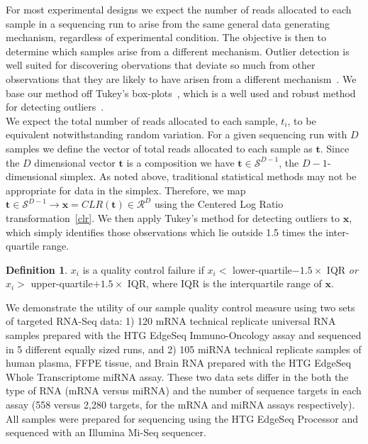 \documentclass{article}\usepackage[]{graphicx}\usepackage[]{color}
\theoremstyle{definition}
\newtheorem{definition}{Definition}
\begin{document}
For most experimental designs we expect the number of reads allocated to each sample in a sequencing run to arise from the same general data generating mechanism, regardless of experimental condition.  The objective is then to determine which samples arise from a different mechanism.  Outlier detection is well suited for discovering obervations that deviate so much from other observations that they are likely to have arisen from a different mechanism~\cite{Hawkins1980}.  We base our method off Tukey's box-plots~\cite{Tukey1977}, which is a well used and robust method for detecting outliers~\cite{Ben-Gal2009}.\\

We expect the total number of reads allocated to each sample, $t_i$, to be equivalent notwithstanding random variation. For a given sequencing run with $D$ samples we define the vector of total reads allocated to each sample as $\mathbf{t}$.  Since the $D$ dimensional vector $\mathbf{t}$ is a composition we have $\mathbf{t} \in \mathcal{S}^{D-1}$, the $D-1$-dimensional simplex. As noted above, traditional statistical methods may not be appropriate for data in the simplex.  Therefore, we map $\mathbf{t} \in \mathcal{S}^{D-1} \rightarrow \mathbf{x} = CLR(\mathbf{t}) \in \mathcal{R}^D$ using the Centered Log Ratio transformation~\ref{clr}.  We then apply Tukey's method for detecting outliers to $\mathbf{x}$, which simply identifies those observations which lie outside 1.5 times the inter-quartile range.

\theoremstyle{definition}
\begin{definition}
$x_i$ is a quality control failure if $x_i <$ lower-quartile$- 1.5 \times$ IQR \emph{or}  $x_i >$ upper-quartile$+ 1.5 \times$ IQR, where IQR is the interquartile range of $\mathbf{x}$.
\end{definition}

We demonstrate the utility of our sample quality control measure using two sets of targeted RNA-Seq data: 1) 120 mRNA technical replicate universal RNA samples prepared with the HTG EdgeSeq Immuno-Oncology assay and sequenced in 5 different equally sized runs, and 2) 105 miRNA technical replicate samples of human plasma, FFPE tissue, and Brain RNA prepared with the HTG EdgeSeq Whole Transcriptome miRNA assay.  These two data sets differ in the both the type of RNA (mRNA versus miRNA) and the number of sequence targets in each assay (558 versus 2,280 targets, for the mRNA and miRNA assays respectively).  All samples were prepared for sequencing using the HTG EdgeSeq Processor and sequenced with an Illumina Mi-Seq sequencer.\\
\end{document}
